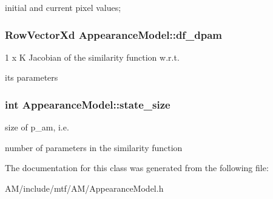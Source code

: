 initial and current pixel values; \hypertarget{classAppearanceModel_a417bdfbe1bed69bbb76feafdc335a4f3}{
\subsubsection[{df\-\_\-dpam}]{\setlength{\rightskip}{0pt plus 5cm}Row\-Vector\-Xd Appearance\-Model\-::df\-\_\-dpam\hspace{0.3cm}{\ttfamily [protected]}}}\label{classAppearanceModel_a417bdfbe1bed69bbb76feafdc335a4f3}


1 x K Jacobian of the similarity function w.\-r.\-t. 

its parameters \hypertarget{classAppearanceModel_a5937ea8489c951e023b5c0b171646107}{
\subsubsection[{state\-\_\-size}]{\setlength{\rightskip}{0pt plus 5cm}int Appearance\-Model\-::state\-\_\-size\hspace{0.3cm}{\ttfamily [protected]}}}\label{classAppearanceModel_a5937ea8489c951e023b5c0b171646107}


size of p\-\_\-am, i.\-e. 

number of parameters in the similarity function 

The documentation for this class was generated from the following file\-:\begin{DoxyCompactItemize}
\item 
A\-M/include/mtf/\-A\-M/Appearance\-Model.\-h\end{DoxyCompactItemize}
